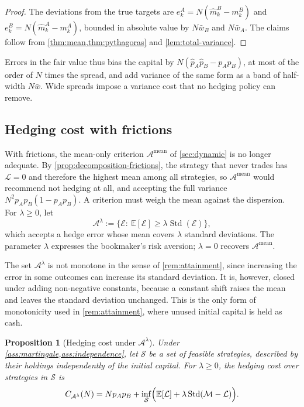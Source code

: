 \documentclass[11pt,a4paper]{article}
\theoremstyle{plain}
\newtheorem{proposition}[theorem]{Proposition}
\theoremstyle{definition}
\theoremstyle{remark}
\newcommand{\E}{\mathbb{E}}
\newcommand{\1}{\mathbf{1}}
\begin{document}
\begin{proof}
The deviations from the true targets are $e^A_k = N(\hat m^B_k - m^B_k)$ and $e^B_k = N(\hat m^A_k - m^A_k)$, bounded in absolute value by $N\bar w_B$ and $N\bar w_A$. The claims follow from \cref{thm:mean,thm:pythagoras} and \cref{lem:total-variance}.
\end{proof}

Errors in the fair value thus bias the capital by $N(\hat p_A\hat p_B - p_Ap_B)$, at most of the order of $N$ times the spread, and add variance of the same form as a band of half-width $N\bar w$. Wide spreads impose a variance cost that no hedging policy can remove.

\subsection{Hedging cost with frictions}

With frictions, the mean-only criterion $\mathcal{A}^{\mathrm{mean}}$ of \cref{sec:dynamic} is no longer adequate. By \cref{prop:decomposition-frictions}, the strategy that never trades has $\mathcal{L}=0$ and therefore the highest mean among all strategies, so $\mathcal{A}^{\mathrm{mean}}$ would recommend not hedging at all, and accepting the full variance $N^2p_Ap_B(1-p_Ap_B)$. A criterion must weigh the mean against the dispersion. For $\lambda\geq 0$, let
\[
\mathcal{A}^{\lambda} := \bigl\{\mathcal{E}:\ \E[\mathcal{E}]\geq\lambda\operatorname{Std}(\mathcal{E})\bigr\},
\]
which accepts a hedge error whose mean covers $\lambda$ standard deviations. The parameter $\lambda$ expresses the bookmaker's risk aversion; $\lambda=0$ recovers $\mathcal{A}^{\mathrm{mean}}$.

The set $\mathcal{A}^\lambda$ is not monotone in the sense of \cref{rem:attainment}, since increasing the error in some outcomes can increase its standard deviation. It is, however, closed under adding non-negative constants, because a constant shift raises the mean and leaves the standard deviation unchanged. This is the only form of monotonicity used in \cref{rem:attainment}, where unused initial capital is held as cash.

\begin{proposition}[Hedging cost under $\mathcal{A}^\lambda$]
\label{prop:hedgecost-frictions}
Under \cref{ass:martingale,ass:independence}, let $\mathcal{S}$ be a set of feasible strategies, described by their holdings independently of the initial capital. For $\lambda\geq 0$, the hedging cost over strategies in $\mathcal{S}$ is
\[
C_{\mathcal{A}^\lambda}(N) = Np_Ap_B + \inf_{\mathcal{S}}\Bigl(\E[\mathcal{L}] + \lambda\operatorname{Std}(\mathcal{M}-\mathcal{L})\Bigr).
\]
\end{proposition}
\end{document}
